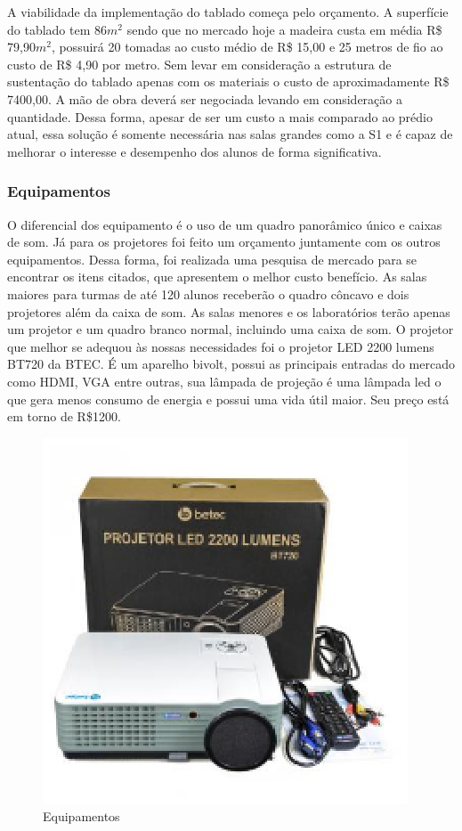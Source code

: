 A viabilidade da implementação do tablado começa pelo orçamento. A superfície do tablado tem 86$m^2$ sendo que no mercado hoje a madeira custa em média R\$ 79,90$m^2$, possuirá 20 tomadas ao custo médio de R\$ 15,00 e 25 metros de fio ao custo de R\$ 4,90 por metro. Sem levar em consideração a estrutura de sustentação do tablado apenas com os materiais o custo de aproximadamente R\$ 7400,00. A mão de obra deverá ser negociada levando em consideração a quantidade. Dessa forma, apesar de ser um custo a mais comparado ao prédio atual, essa solução é somente necessária nas salas grandes como a S1 e é capaz de melhorar o interesse e desempenho dos alunos de forma significativa.

\subsubsection{Equipamentos}
O diferencial dos equipamento é o uso de um quadro panorâmico único e caixas de som. Já para os projetores foi feito um orçamento juntamente com os outros equipamentos. Dessa forma, foi realizada uma pesquisa de mercado para se encontrar os itens citados, que apresentem o melhor custo benefício. As salas maiores para turmas de até 120 alunos receberão o quadro côncavo e dois projetores além da caixa de som. As salas menores e os laboratórios terão apenas um projetor e um quadro branco normal, incluindo uma caixa de som.
O projetor que melhor se adequou às nossas necessidades foi o projetor LED 2200 lumens BT720 da BTEC. É um aparelho bivolt, possui as principais entradas do mercado como HDMI, VGA entre outras, sua lâmpada de projeção é uma lâmpada led o que gera menos consumo de energia e possui uma vida útil maior. Seu preço está em torno de R\$1200.

\begin{figure}[!ht]
\centering
\includegraphics[keepaspectratio=true,scale=1]{figuras/equipamentos.eps}
\caption{Equipamentos}
\end{figure}

